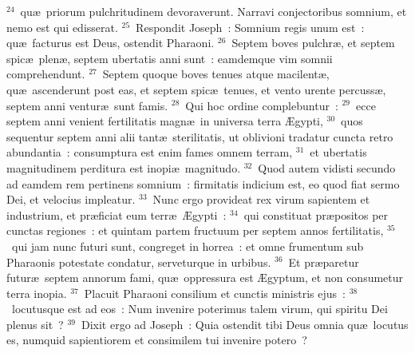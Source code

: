 ${}^{24}$~qu\ae\ priorum pulchritudinem devoraverunt. Narravi conjectoribus somnium, et nemo est qui edisserat.
${}^{25}$~Respondit Joseph~: Somnium regis unum est~: qu\ae\ facturus est Deus, ostendit Pharaoni.
${}^{26}$~Septem boves pulchr\ae , et septem spic\ae\ plen\ae , septem ubertatis anni sunt~: eamdemque vim somnii comprehendunt.
${}^{27}$~Septem quoque boves tenues atque macilent\ae , qu\ae\ ascenderunt post eas, et septem spic\ae\ tenues, et vento urente percuss\ae , septem anni ventur\ae\ sunt famis.
${}^{28}$~Qui hoc ordine complebuntur~:
${}^{29}$~ecce septem anni venient fertilitatis magn\ae\ in universa terra \AE gypti,
${}^{30}$~quos sequentur septem anni alii tant\ae\ sterilitatis, ut oblivioni tradatur cuncta retro abundantia~: consumptura est enim fames omnem terram,
${}^{31}$~et ubertatis magnitudinem perditura est inopi\ae\ magnitudo.
${}^{32}$~Quod autem vidisti secundo ad eamdem rem pertinens somnium~: firmitatis indicium est, eo quod fiat sermo Dei, et velocius impleatur.
${}^{33}$~Nunc ergo provideat rex virum sapientem et industrium, et pr\ae ficiat eum terr\ae\ \AE gypti~:
${}^{34}$~qui constituat pr\ae positos per cunctas regiones~: et quintam partem fructuum per septem annos fertilitatis,
${}^{35}$~qui jam nunc futuri sunt, congreget in horrea~: et omne frumentum sub Pharaonis potestate condatur, serveturque in urbibus.
${}^{36}$~Et pr\ae paretur futur\ae\ septem annorum fami, qu\ae\ oppressura est \AE gyptum, et non consumetur terra inopia.
${}^{37}$~Placuit Pharaoni consilium et cunctis ministris ejus~:
${}^{38}$~locutusque est ad eos~: Num invenire poterimus talem virum, qui spiritu Dei plenus sit~?
${}^{39}$~Dixit ergo ad Joseph~: Quia ostendit tibi Deus omnia qu\ae\ locutus es, numquid sapientiorem et consimilem tui invenire potero~?


